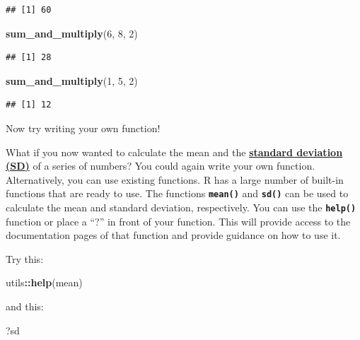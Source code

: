 \documentclass[
]{book}
\newenvironment{Shaded}{\begin{snugshade}}{\end{snugshade}}
\newcommand{\DecValTok}[1]{\textcolor[rgb]{0.00,0.00,0.81}{#1}}
\newcommand{\FunctionTok}[1]{\textcolor[rgb]{0.13,0.29,0.53}{\textbf{#1}}}
\newcommand{\NormalTok}[1]{#1}
\newcommand{\SpecialCharTok}[1]{\textcolor[rgb]{0.81,0.36,0.00}{\textbf{#1}}}
\begin{document}
\begin{verbatim}
## [1] 60
\end{verbatim}

\begin{Shaded}
\begin{Highlighting}[]
\FunctionTok{sum\_and\_multiply}\NormalTok{(}\DecValTok{6}\NormalTok{, }\DecValTok{8}\NormalTok{, }\DecValTok{2}\NormalTok{)}
\end{Highlighting}
\end{Shaded}

\begin{verbatim}
## [1] 28
\end{verbatim}

\begin{Shaded}
\begin{Highlighting}[]
\FunctionTok{sum\_and\_multiply}\NormalTok{(}\DecValTok{1}\NormalTok{, }\DecValTok{5}\NormalTok{, }\DecValTok{2}\NormalTok{)}
\end{Highlighting}
\end{Shaded}

\begin{verbatim}
## [1] 12
\end{verbatim}

Now try writing your own function!

What if you now wanted to calculate the mean and the \textbf{\hyperref[acronyms_SD]{standard deviation (SD)}} of a series of numbers? You could again write your own function. Alternatively, you can use existing functions. R has a large number of built-in functions that are ready to use. The functions \textbf{\texttt{mean()}} and \textbf{\texttt{sd()}} can be used to calculate the mean and standard deviation, respectively. You can use the \textbf{\texttt{help()}} function or place a ``?'' in front of your function. This will provide access to the documentation pages of that function and provide guidance on how to use it.

Try this:

\begin{Shaded}
\begin{Highlighting}[]
\NormalTok{utils}\SpecialCharTok{::}\FunctionTok{help}\NormalTok{(mean)}
\end{Highlighting}
\end{Shaded}

and this:

\begin{Shaded}
\begin{Highlighting}[]
\NormalTok{?sd}
\end{Highlighting}
\end{Shaded}
\end{document}
